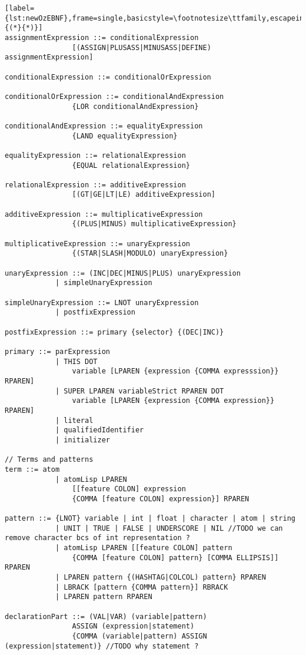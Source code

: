 \begin{lstlisting}[label={lst:newOzEBNF},frame=single,basicstyle=\footnotesize\ttfamily,escapeinside={(*}{*)}]
assignmentExpression ::= conditionalExpression
                [(ASSIGN|PLUSASS|MINUSASS|DEFINE) assignmentExpression]

conditionalExpression ::= conditionalOrExpression

conditionalOrExpression ::= conditionalAndExpression
                {LOR conditionalAndExpression}

conditionalAndExpression ::= equalityExpression
                {LAND equalityExpression}

equalityExpression ::= relationalExpression
                {EQUAL relationalExpression}

relationalExpression ::= additiveExpression
                [(GT|GE|LT|LE) additiveExpression]

additiveExpression ::= multiplicativeExpression
                {(PLUS|MINUS) multiplicativeExpression}

multiplicativeExpression ::= unaryExpression
                {(STAR|SLASH|MODULO) unaryExpression}

unaryExpression ::= (INC|DEC|MINUS|PLUS) unaryExpression
            | simpleUnaryExpression

simpleUnaryExpression ::= LNOT unaryExpression
            | postfixExpression

postfixExpression ::= primary {selector} {(DEC|INC)}

primary ::= parExpression
            | THIS DOT
                variable [LPAREN {expression {COMMA expresssion}} RPAREN]
            | SUPER LPAREN variableStrict RPAREN DOT
                variable [LPAREN {expression {COMMA expression}} RPAREN]
            | literal
            | qualifiedIdentifier
            | initializer

// Terms and patterns
term ::= atom
            | atomLisp LPAREN
                [[feature COLON] expression
                {COMMA [feature COLON] expression}] RPAREN

pattern ::= {LNOT} variable | int | float | character | atom | string
            | UNIT | TRUE | FALSE | UNDERSCORE | NIL //TODO we can remove character bcs of int representation ?
            | atomLisp LPAREN [[feature COLON] pattern
                {COMMA [feature COLON] pattern} [COMMA ELLIPSIS]] RPAREN
            | LPAREN pattern {(HASHTAG|COLCOL) pattern} RPAREN
            | LBRACK [pattern {COMMA pattern}] RBRACK
            | LPAREN pattern RPAREN

declarationPart ::= (VAL|VAR) (variable|pattern)
                ASSIGN (expression|statement)
                {COMMA (variable|pattern) ASSIGN (expression|statement)} //TODO why statement ?


\end{lstlisting}
